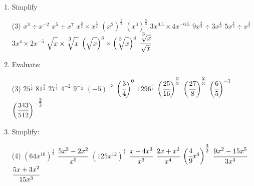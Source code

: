 \documentclass[fleqn]{article}
\begin{document}
\exercise{}
\begin{enumerate}
    \item Simplify
        \begin{tasks}(3) %
            \task $x^3 \div x^{-2}$
            \task $x^5 \div x^7$
            \task $x^{\textstyle\frac{3}{2}} \times x^{\textstyle\frac{5}{2}}$
            \task $(x^2)^{\textstyle\frac{3}{2}}$
            \task $(x^3)^{\textstyle\frac{5}{3}}$
            \task $3x^{0.5} \times 4x^{-0.5}$
            \task $9x^{\textstyle\frac{2}{3}} \div 3x^{\textstyle\frac{1}{6}}$
            \task $5x^{\textstyle\frac{7}{5}} \div x^{\textstyle\frac{2}{5}}$
            \task $3x^4 \times 2x^{-5}$
            \task $\sqrt{\strut x} \times \sqrt[\textstyle{^3}]{\strut x}$
            \task $\Big(\sqrt{\strut x}\Big)^3 \times \Big(\sqrt[\textstyle{^3}]{\strut x}\Big)^4$
            \task $\cfrac{\sqrt[\textstyle{^3}]{ x}}{\sqrt{x}}$
        \end{tasks}
        
    \item Evaluate:
        \begin{tasks}(3)%
            \task $25^{\textstyle\frac{1}{2}}$
            \task $81^{\textstyle\frac{3}{2}}$
            \task $27^{\textstyle\frac{1}{3}}$
            \task $4^{-2}$
            \task $9^{-\textstyle\frac{1}{2}}$
            \task $(-5)^{-3}$
            \task $\bigg(\cfrac{3}{4}\bigg)^0$
            \task $1296^{\textstyle\frac{3}{4}}$
            \task $\bigg(\cfrac{25}{16}\bigg)^{\textstyle\frac{3}{2}}$
            \task $\bigg(\cfrac{27}{8}\bigg)^{\textstyle\frac{2}{3}}$
            \task $\bigg(\cfrac{6}{5}\bigg)^{-1}$
            \task $\bigg(\cfrac{343}{512}\bigg)^{-\textstyle\frac{2}{3}}$
        \end{tasks}
        \newpage
        
    \item Simplify:
        \vspace{-2mm}
        \begin{tasks}(4) %
            \task $(64x^{10})^{\textstyle\frac{1}{2}}$
            \task $\cfrac{5x^3-2x^2}{x^5}$
            \task $(125x^{12})^{\textstyle\frac{1}{3}}$
            \task $\cfrac{x+4x^3}{x^3}$
            \task $\cfrac{2x+x^2}{x^4}$
            \task $\bigg(\cfrac{4}{9}x^4\bigg)^{\textstyle\frac{3}{2}}$
            \task $\cfrac{9x^2-15x^5}{3x^3}$
            \task $\cfrac{5x+3x^2}{15x^3}$
        \end{tasks}
        

\end{enumerate}
\end{document}
